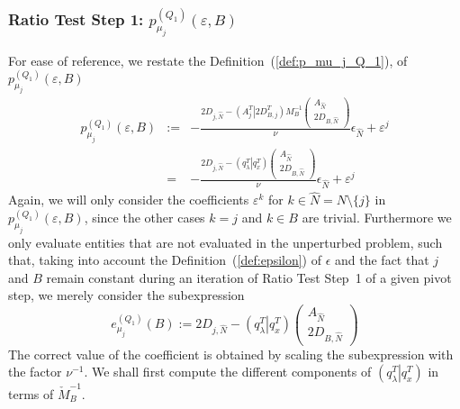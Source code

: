 \documentclass[a4paper]{article}
\newcommand{\pmu}[2]{\ensuremath{p_{\mu_{j}}^{(#1)}(\varepsilon, #2)}}
\begin{document}
\subsubsection{Ratio Test Step 1:
\pmu{Q_{1}}{B}}
For ease of reference, we restate the Definition~(\ref{def:p_mu_j_Q_1}),
of \pmu{Q_{1}}{B}
\begin{eqnarray*}
\pmu{Q_{1}}{B} &:=& 
  -\frac{2D_{j, \hat{N}} -
    \left(A_{j}^{T} \left| \right. 2D_{B, j}^{T} \right)
    M_{B}^{-1}
    \left(\begin{array}{c}
            A_{\hat{N}} \\
	    \hline
	    2D_{B,\hat{N}}
	  \end{array}
    \right)}{\nu}
  \epsilon_{\hat{N}}
  +\varepsilon^{j}
\\
&=&
  -\frac{2D_{j, \hat{N}} -
    \left(q_{\lambda}^{T} \left| \right. q_{x}^{T} \right)
    \left(\begin{array}{c}
            A_{\hat{N}} \\
	    \hline
	    2D_{B,\hat{N}}
	  \end{array}
    \right)}{\nu}
  \epsilon_{\hat{N}}
  +\varepsilon^{j}
\end{eqnarray*}
Again, we will only consider the coefficients
$\varepsilon^{k}$ for $k \in \hat{N}= N \setminus \{j\}$ in
\pmu{Q_{1}}{B}, since the other cases $k=j$ and $k \in B$
are trivial. Furthermore we only evaluate entities that are not evaluated in the
unperturbed problem, such that, taking into account the
Definition~(\ref{def:epsilon}) of $\epsilon$
and the fact that $j$ and $B$ remain constant during an iteration of Ratio Test
Step~1 of a given pivot step, 
we merely consider the subexpression
\begin{equation}
\label{def:e_mu_j_Q_1}
e_{\mu_{j}}^{(Q_{1})}(B):=
2D_{j, \hat{N}} -
    \left(q_{\lambda}^{T} \left| \right. q_{x}^{T} \right)
    \left(\begin{array}{c}
            A_{\hat{N}} \\
	    \hline
	    2D_{B,\hat{N}}
	  \end{array}
    \right)
\end{equation}
The correct value of the coefficient is obtained by scaling the subexpression
with the factor $\nu^{-1}$.
We shall first compute the different components of
$\left(q_{\lambda}^{T} \left|\right. q_{x}^{T}\right)$ in terms of
$\check{M}_{B}^{-1}$.
\end{document}
